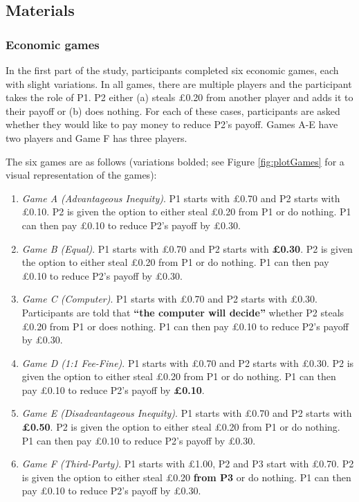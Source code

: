 \documentclass[
  man,floatsintext]{apa6}
\providecommand{\tightlist}{%
  \setlength{\itemsep}{0pt}\setlength{\parskip}{0pt}}
\begin{document}
\hypertarget{materials}{%
\subsection{Materials}\label{materials}}

\hypertarget{economic-games}{%
\subsubsection{Economic games}\label{economic-games}}

In the first part of the study, participants completed six economic games, each
with slight variations. In all games, there are multiple players and the
participant takes the role of P1. P2 either (a) steals £0.20 from another player
and adds it to their payoff or (b) does nothing. For each of these cases,
participants are asked whether they would like to pay money to reduce P2's
payoff. Games A-E have two players and Game F has three players.

The six games are as follows (variations bolded; see Figure \ref{fig:plotGames}
for a visual representation of the games):

\begin{enumerate}
\def\labelenumi{\arabic{enumi}.}
\tightlist
\item
  \emph{Game A (Advantageous Inequity)}. P1 starts with £0.70 and P2 starts with
  £0.10. P2 is given the option to either steal £0.20 from P1 or do nothing. P1
  can then pay £0.10 to reduce P2's payoff by £0.30.
\item
  \emph{Game B (Equal)}. P1 starts with £0.70 and P2 starts with \textbf{£0.30}. P2 is
  given the option to either steal £0.20 from P1 or do nothing. P1 can then pay
  £0.10 to reduce P2's payoff by £0.30.
\item
  \emph{Game C (Computer)}. P1 starts with £0.70 and P2 starts with £0.30.
  Participants are told that \textbf{``the computer will decide''} whether P2 steals
  £0.20 from P1 or does nothing. P1 can then pay £0.10 to reduce P2's payoff by
  £0.30.
\item
  \emph{Game D (1:1 Fee-Fine)}. P1 starts with £0.70 and P2 starts with £0.30. P2 is
  given the option to either steal £0.20 from P1 or do nothing. P1 can then pay
  £0.10 to reduce P2's payoff by \textbf{£0.10}.
\item
  \emph{Game E (Disadvantageous Inequity)}. P1 starts with £0.70 and P2 starts with
  \textbf{£0.50}. P2 is given the option to either steal £0.20 from P1 or do
  nothing. P1 can then pay £0.10 to reduce P2's payoff by £0.30.
\item
  \emph{Game F (Third-Party)}. P1 starts with £1.00, P2 and P3 start with £0.70. P2
  is given the option to either steal £0.20 \textbf{from P3} or do nothing. P1 can
  then pay £0.10 to reduce P2's payoff by £0.30.
\end{enumerate}
\end{document}
